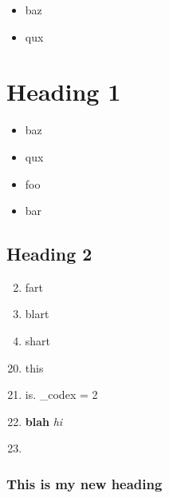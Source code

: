 \documentclass{article}
\begin{document}
\begin{itemize}
    \item baz
    \item qux
\end{itemize}

\section{Heading 1}
\begin{itemize}
    \item baz
    \item qux
\end{itemize}

\begin{itemize}
    \item foo
    \item bar
\end{itemize}

\subsection{Heading 2}
\begin{enumerate}
    \setcounter{enumi}{1}
    \item  fart
    \item  blart
    \item  shart
\end{enumerate}

\begin{enumerate}
    \setcounter{enumi}{19}
    \item  this
    \item  is. \inline_code{x = 2}
    \item  \textbf{blah} \textit{hi}
    \item  {}
\end{enumerate}

\subsubsection{This is my new heading}
\end{document}
